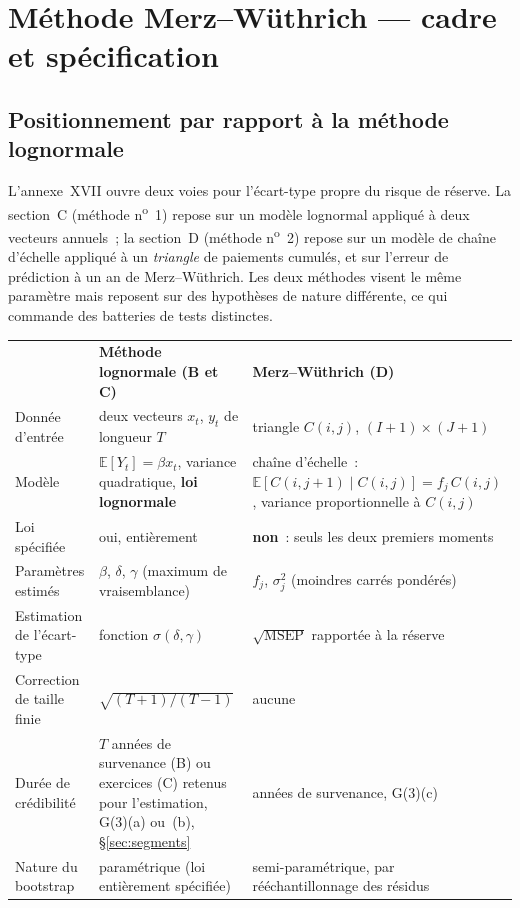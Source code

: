 \documentclass[a4paper,11pt]{article}
\begin{document}
\clearpage
\section{Méthode Merz--Wüthrich --- cadre et spécification}
\label{sec:mw}

\subsection{Positionnement par rapport à la méthode lognormale}

L'annexe~XVII ouvre deux voies pour l'écart-type propre du risque de réserve. La
section~C (méthode n\textsuperscript{o}~1) repose sur un modèle lognormal appliqué
à deux vecteurs annuels~; la section~D (méthode n\textsuperscript{o}~2) repose sur
un modèle de chaîne d'échelle appliqué à un \emph{triangle} de paiements cumulés,
et sur l'erreur de prédiction à un an de Merz--Wüthrich. Les deux méthodes visent
le même paramètre mais reposent sur des hypothèses de nature différente, ce qui
commande des batteries de tests distinctes.

\begin{center}
\small
{}
\begin{tabular}{@{}p{3.1cm}p{5.7cm}p{6.0cm}@{}}
\rowcolor{tableheader}
& \textcolor{financeblue}{\textbf{Méthode lognormale (B et C)}} &
\textcolor{financeblue}{\textbf{Merz--Wüthrich (D)}} \\
Donnée d'entrée & deux vecteurs $x_t$, $y_t$ de longueur $T$ &
triangle $C(i,j)$, $(I+1)\times(J+1)$ \\
Modèle & $\mathbb{E}[Y_t] = \beta x_t$, variance quadratique, \textbf{loi lognormale} &
chaîne d'échelle~: $\mathbb{E}[C(i,j+1)\mid C(i,j)] = f_j\,C(i,j)$, variance
proportionnelle à $C(i,j)$ \\
Loi spécifiée & oui, entièrement & \textbf{non}~: seuls les deux premiers moments \\
Paramètres estimés & $\beta$, $\delta$, $\gamma$ (maximum de vraisemblance) &
$f_j$, $\sigma_j^2$ (moindres carrés pondérés) \\
Estimation de l'écart-type & fonction $\sigma(\delta,\gamma)$ &
$\sqrt{\mathrm{MSEP}}$ rapportée à la réserve \\
Correction de taille finie & $\sqrt{(T+1)/(T-1)}$ & aucune \\
Durée de crédibilité & $T$ années de survenance (B) ou exercices (C) retenus pour l'estimation,
G(3)(a) ou~(b), §\ref{sec:segments} &
années de survenance, G(3)(c) \\
Nature du bootstrap & paramétrique (loi entièrement spécifiée) &
semi-paramétrique, par rééchantillonnage des résidus \\
\end{tabular}
\end{center}
\end{document}
